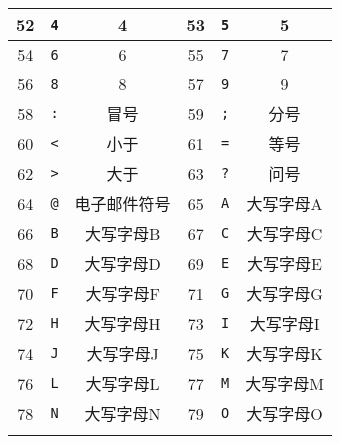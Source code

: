 \begin{longtable}{|c|c|c|c|c|c|}
            52   & \texttt{4}         & 4                   	& 53   & \texttt{5}         & 5                   	\\
            \hline \rule{0pt}{15pt}
            54   & \texttt{6}         & 6                   	& 55   & \texttt{7}         & 7                   	\\
            \hline \rule{0pt}{15pt}
            56   & \texttt{8}         & 8                   	& 57   & \texttt{9}         & 9                   	\\
            \hline \rule{0pt}{15pt}
            58   & \texttt{:}         & 冒号              	& 59   & \texttt{;}         & 分号              	\\
            \hline \rule{0pt}{15pt}
            60   & \texttt{<}         & 小于              	& 61   & \texttt{=}         & 等号              	\\
            \hline \rule{0pt}{15pt}
            62   & \texttt{>}         & 大于              	& 63   & \texttt{?}         & 问号              	\\
            \hline \rule{0pt}{15pt}
            64   & \texttt{@}         & 电子邮件符号  	& 65   & \texttt{A}         & 大写字母A       	\\
            \hline \rule{0pt}{15pt}
            66   & \texttt{B}         & 大写字母B       	& 67   & \texttt{C}         & 大写字母C       	\\
            \hline \rule{0pt}{15pt}
            68   & \texttt{D}         & 大写字母D       	& 69   & \texttt{E}         & 大写字母E       	\\
            \hline \rule{0pt}{15pt}
            70   & \texttt{F}         & 大写字母F       	& 71   & 	\texttt{G}         & 大写字母G       	\\
            \hline \rule{0pt}{15pt}
            72   & 	\texttt{H}         & 大写字母H       	& 73   & 	\texttt{I}         & 大写字母I       	\\
            \hline \rule{0pt}{15pt}
            74   & 	\texttt{J}         & 大写字母J       	& 75   & 	\texttt{K}         & 大写字母K       	\\
            \hline \rule{0pt}{15pt}
            76   &  \texttt{L}         & 大写字母L       	& 77   & 	\texttt{M}         & 大写字母M       	\\
            \hline \rule{0pt}{15pt}
            78   & 	\texttt{N}         & 大写字母N       	& 79   & 	\texttt{O}         & 大写字母O       	\\
            \hline \rule{0pt}{15pt}

\end{longtable}
